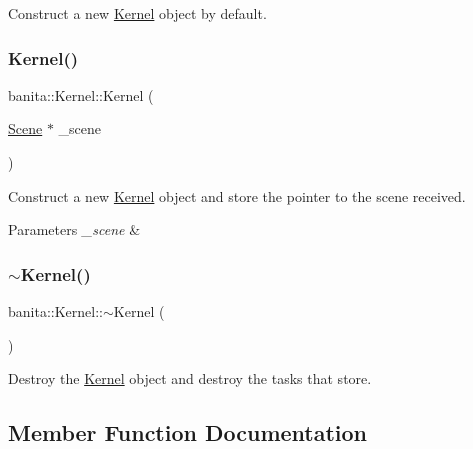 Construct a new \mbox{\hyperlink{classbanita_1_1_kernel}{Kernel}} object by default. 

\mbox{\label{classbanita_1_1_kernel_ad0fef1effc29769a6438653e86e04b25}} 
\subsubsection{\texorpdfstring{Kernel()}{Kernel()}\hspace{0.1cm}{\footnotesize\ttfamily [2/2]}}
{\footnotesize\ttfamily banita\+::\+Kernel\+::\+Kernel (\begin{DoxyParamCaption}\item[{\mbox{\hyperlink{classbanita_1_1_scene}{Scene}} $\ast$}]{\+\_\+scene }\end{DoxyParamCaption})\hspace{0.3cm}{\ttfamily [inline]}}



Construct a new \mbox{\hyperlink{classbanita_1_1_kernel}{Kernel}} object and store the pointer to the scene received. 


\begin{DoxyParams}{Parameters}
{\em \+\_\+scene} & \\
\hline
\end{DoxyParams}
\mbox{\label{classbanita_1_1_kernel_a76d732a249e2b546288488af3fa7f928}} 
\subsubsection{\texorpdfstring{$\sim$Kernel()}{~Kernel()}}
{\footnotesize\ttfamily banita\+::\+Kernel\+::$\sim$\+Kernel (\begin{DoxyParamCaption}{ }\end{DoxyParamCaption})\hspace{0.3cm}{\ttfamily [inline]}}



Destroy the \mbox{\hyperlink{classbanita_1_1_kernel}{Kernel}} object and destroy the tasks that store. 



\subsection{Member Function Documentation}
\mbox{\label{classbanita_1_1_kernel_a51ad67eb5beec04052643a58698a1263}} 
